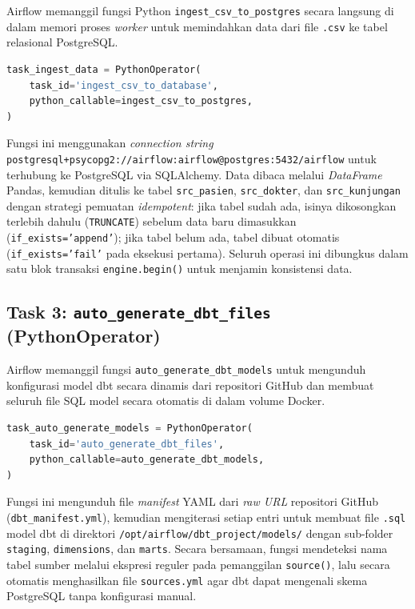 Airflow memanggil fungsi Python \texttt{ingest\_csv\_to\_postgres} secara langsung di dalam
memori proses \textit{worker} untuk memindahkan data dari file \texttt{.csv} ke tabel
relasional PostgreSQL.

\begin{lstlisting}[language=Python, caption=Definisi Task ingest\_csv\_to\_database]
task_ingest_data = PythonOperator(
    task_id='ingest_csv_to_database',
    python_callable=ingest_csv_to_postgres,
)
\end{lstlisting}

Fungsi ini menggunakan \textit{connection string}
\texttt{postgresql+psycopg2://airflow:airflow@postgres:5432/airflow} untuk terhubung ke
PostgreSQL via SQLAlchemy. Data dibaca melalui \textit{DataFrame} Pandas, kemudian ditulis ke
tabel \texttt{src\_pasien}, \texttt{src\_dokter}, dan \texttt{src\_kunjungan} dengan strategi
pemuatan \textit{idempotent}: jika tabel sudah ada, isinya dikosongkan terlebih dahulu
(\texttt{TRUNCATE}) sebelum data baru dimasukkan (\texttt{if\_exists='append'}); jika tabel
belum ada, tabel dibuat otomatis (\texttt{if\_exists='fail'} pada eksekusi pertama). Seluruh
operasi ini dibungkus dalam satu blok transaksi \texttt{engine.begin()} untuk menjamin
konsistensi data.

\subsection*{Task 3: \texttt{auto\_generate\_dbt\_files} (PythonOperator)}

Airflow memanggil fungsi \texttt{auto\_generate\_dbt\_models} untuk mengunduh konfigurasi
model dbt secara dinamis dari repositori GitHub dan membuat seluruh file SQL model secara
otomatis di dalam volume Docker.

\begin{lstlisting}[language=Python, caption=Definisi Task auto\_generate\_dbt\_files]
task_auto_generate_models = PythonOperator(
    task_id='auto_generate_dbt_files',
    python_callable=auto_generate_dbt_models,
)
\end{lstlisting}

Fungsi ini mengunduh file \textit{manifest} YAML dari \textit{raw URL} repositori GitHub
(\texttt{dbt\_manifest.yml}), kemudian mengiterasi setiap entri untuk membuat file
\texttt{.sql} model dbt di direktori \texttt{/opt/airflow/dbt\_project/models/} dengan
sub-folder \texttt{staging}, \texttt{dimensions}, dan \texttt{marts}. Secara bersamaan,
fungsi mendeteksi nama tabel sumber melalui ekspresi reguler pada pemanggilan
\texttt{source()}, lalu secara otomatis menghasilkan file \texttt{sources.yml} agar dbt
dapat mengenali skema PostgreSQL tanpa konfigurasi manual.

